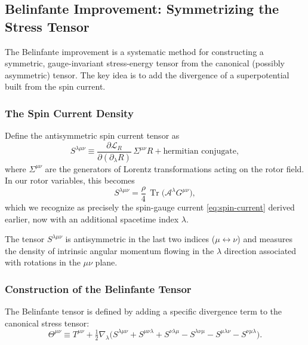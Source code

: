\documentclass[11pt,a4paper]{article}
\numberwithin{equation}{section}
\theoremstyle{plain}
\theoremstyle{definition}
\theoremstyle{remark}
\DeclareMathOperator{\Tr}{Tr}
\begin{document}
\subsection{Belinfante Improvement: Symmetrizing the Stress Tensor}

The Belinfante improvement is a systematic method for constructing a symmetric, gauge-invariant stress-energy tensor from the canonical (possibly asymmetric) tensor. The key idea is to add the divergence of a superpotential built from the spin current.

\subsubsection{The Spin Current Density}

Define the antisymmetric spin current tensor as
\begin{equation}
S^{\lambda\mu\nu} \equiv \frac{\partial \mathcal{L}_R}{\partial (\partial_\lambda R)}\,\Sigma^{\mu\nu}R + \text{hermitian conjugate},
\end{equation}
where $\Sigma^{\mu\nu}$ are the generators of Lorentz transformations acting on the rotor field. In our rotor variables, this becomes
\begin{equation}
S^{\lambda\mu\nu} = \frac{\rho}{4}\,\Tr\!\big(\mathcal{A}^\lambda G^{\mu\nu}\big),
\label{eq:spin-tensor}
\end{equation}
which we recognize as precisely the spin-gauge current \eqref{eq:spin-current} derived earlier, now with an additional spacetime index $\lambda$.

The tensor $S^{\lambda\mu\nu}$ is antisymmetric in the last two indices ($\mu \leftrightarrow \nu$) and measures the density of intrinsic angular momentum flowing in the $\lambda$ direction associated with rotations in the $\mu\nu$ plane.

\subsubsection{Construction of the Belinfante Tensor}

The Belinfante tensor is defined by adding a specific divergence term to the canonical stress tensor:
\begin{equation}
\Theta^{\mu\nu} \equiv T^{\mu\nu} + \tfrac{1}{2}\nabla_\lambda\!\big( S^{\lambda\mu\nu} + S^{\mu\nu\lambda} + S^{\nu\lambda\mu} - S^{\lambda\nu\mu} - S^{\mu\lambda\nu} - S^{\nu\mu\lambda} \big).
\label{eq:belinfante-def}
\end{equation}
\end{document}
